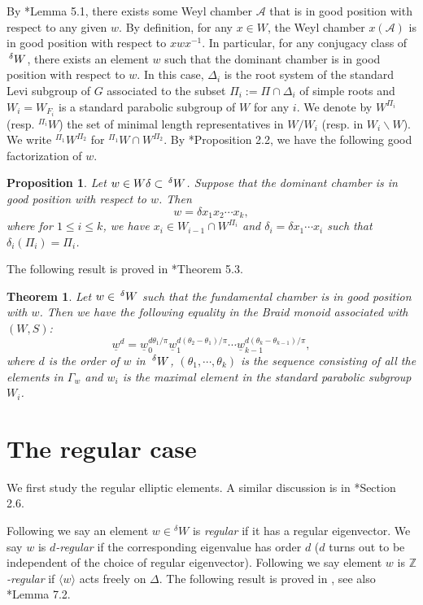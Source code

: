 \documentclass[10pt,leqno]{article}
\newtheorem{theorem}[equation]{Theorem}
\newtheorem{proposition}[equation]{Proposition}
\newcommand{\caA}{\mathcal A}
\renewcommand{\sec}[1]{\section{#1}
\renewcommand{\theequation}{\thesection.\arabic{equation}}
  \setcounter{equation}{0}}
\newcommand{\Wext}{\negthinspace\negthinspace\phantom{a}^\delta W}
\def\le{\leqslant}
\def\G{\Gamma}
\def\d{\delta}
\renewcommand{\sec}[1]{\section{#1}
\renewcommand{\theequation}{\thesection.\arabic{equation}}
  \setcounter{equation}{0}}
\begin{document}
By \cite{he_nie_minimal_finite}*{Lemma 5.1}, there exists some Weyl chamber $\caA$ that is
in good position with respect to any given $w$. By definition, for any
$x \in W$, the Weyl chamber $x(\caA)$ is in good position with respect
to $x w x^{-1}$. In particular, for any conjugacy class of $\Wext$,
there exists an element $w$ such that the dominant chamber is in good
position with respect to $w$. In this case, $\Delta_i$ is the root system
of the standard Levi subgroup of $G$ associated to the subset
$\Pi_i:=\Pi \cap \Delta_i$ of simple roots and $W_i=W_{F_i}$ is a standard
parabolic subgroup of $W$ for any $i$. We denote by $W^{\Pi_i}$ (resp. ${}^{\Pi_i} W$) the
set of minimal length representatives in $W/W_i$ (resp. in $W_i \backslash W$). We write ${}^{\Pi_1} W^{\Pi_2}$ for ${}^{\Pi_1} W \cap W^{\Pi_2}$. By \cite{he_nie_minimal_finite}*{Proposition
2.2}, we have the following good factorization of $w$.

\begin{proposition}\label{good-fac} Let $w \in W \d \subset
\Wext$. Suppose that the dominant chamber is in good position with
respect to $w$. Then $$w=\d x_1 x_2 \cdots x_k,$$ where for $1 \le i
\le k$, we have $x_i \in W_{i-1} \cap W^{\Pi_i}$ and $\d_i=\d x_1
\cdots x_{i}$ such that $\d_i (\Pi_i)=\Pi_i$.
\end{proposition}

The following result is proved in \cite{he_nie_minimal_finite}*{Theorem 5.3}.

\begin{theorem}
\label{t:braid}
Let $w \in \Wext$ such that the fundamental chamber is
in good position with $w$. Then we have the following equality in the
Braid monoid associated with $(W, S)$: $$\underline w^d=\underline
w_0^{d \theta_1/\pi} \underline w_1^{d (\theta_2-\theta_1)/\pi} \cdots
\underline w_{k-1}^{d (\theta_{k}-\theta_{k-1})/\pi},$$ where $d$ is
the order of $w$ in $\Wext$, $(\theta_1, \cdots,
\theta_k)$ is the sequence consisting of all the elements in $\G_{w}$
and $w_i$ is the maximal element in the standard parabolic subgroup
$W_i$.
\end{theorem}

\sec{The regular case}
\label{s:regular}

We first study the regular elliptic elements. 
A similar discussion is in \cite{reeder_torsion}*{Section 2.6}.

Following
\cite{springer_regular} we say an element $w \in {}^{\delta} W$ is {\it regular} if it has a
regular eigenvector. We say $w$ is {\it $d$-regular} if the corresponding eigenvalue has
order $d$ ($d$ turns out to be independent of the choice of regular eigenvector).
Following \cite{rgly} we say
element $w$ is {\it $\mathbb Z$-regular} if $\langle w\rangle$ acts freely
on $\Delta$. The following result is proved in \cite[Prop. 1]{rgly}, see also \cite{AH}*{Lemma 7.2}.
\end{document}
